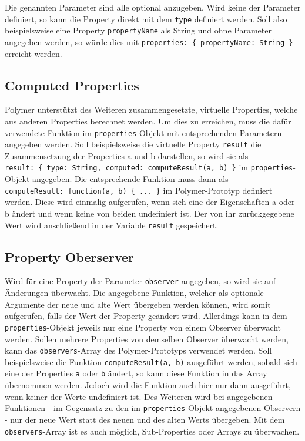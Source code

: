 Die genannten Parameter sind alle optional anzugeben. Wird keine der Parameter definiert, so kann die Property direkt mit dem \texttt{type} definiert werden. Soll also beispielsweise eine Property \texttt{propertyName} als String und ohne Parameter angegeben werden, so würde dies mit \texttt{properties:\ \{\ propertyName:\ String\ \}} erreicht werden.


\subsection{Computed Properties}\label{computed-properties}

Polymer unterstützt des Weiteren zusammengesetzte, virtuelle Properties, welche aus anderen Properties berechnet werden. Um dies zu erreichen, muss die dafür verwendete Funktion im \texttt{properties}-Objekt mit entsprechenden Parametern angegeben werden. Soll beispielsweise die virtuelle Property \texttt{result} die Zusammensetzung der Properties a und b darstellen, so wird sie als \texttt{result:\ \{\ type:\ String,\ computed:\ computeResult(a,\ b)\ \}} im \texttt{properties}-Objekt angegeben. Die entsprechende Funktion muss dann als \texttt{computeResult:\ function(a,\ b)\ \{\ ...\ \}} im Polymer-Prototyp definiert werden. Diese wird einmalig aufgerufen, wenn sich eine der Eigenschaften a oder b ändert und wenn keine von beiden undefiniert ist. Der von ihr zurückgegebene Wert wird anschließend in der Variable \texttt{result} gespeichert.


\subsection{Property Oberserver}\label{property-oberserver}

Wird für eine Property der Parameter \texttt{observer} angegeben, so wird sie auf Änderungen überwacht. Die angegebene Funktion, welcher als optionale Argumente der neue und alte Wert übergeben werden können, wird somit aufgerufen, falls der Wert der Property geändert wird. Allerdings kann in dem \texttt{properties}-Objekt jeweils nur eine Property von einem Observer überwacht werden. Sollen mehrere Properties von demselben Observer überwacht werden, kann das \texttt{observers}-Array des Polymer-Prototyps verwendet werden. Soll beispielsweise die Funktion \texttt{computeResult(a,\ b)} ausgeführt werden, sobald sich eine der Properties \texttt{a} oder \texttt{b} ändert, so kann diese Funktion in das Array übernommen werden. Jedoch wird die Funktion auch hier nur dann ausgeführt, wenn keiner der Werte undefiniert ist. Des Weiteren wird bei angegebenen Funktionen - im Gegensatz zu den im \texttt{properties}-Objekt angegebenen Observern - nur der neue Wert statt des neuen und des alten Werts übergeben. Mit dem \texttt{observers}-Array ist es auch möglich, Sub-Properties oder Arrays zu überwachen.

